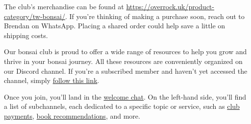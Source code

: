 \label{2025-04-news}


	
	

{}
\noindent
The club's merchandise can be found at \url{https://overrock.uk/product-category/tw-bonsai/}.
If you're thinking of making a purchase soon, reach out to Brendan on WhatsApp.
Placing a shared order could help save a little on shipping costs.

\medskip
{}
\noindent  
Our bonsai club is proud to offer a wide range of resources to help you grow and thrive in your bonsai journey.
All these resources are conveniently organized on our Discord channel.
If you're a subscribed member and haven’t yet accessed the channel, simply \href{https://discord.gg/N6yka6XJ}{follow this link}.

Once you join, you'll land in the \href{https://discord.com/channels/873817545013071872/1118677826208550923}{welcome chat}.
On the left\--hand side, you'll find a list of subchannels, each dedicated to a specific topic or service, such as \href{https://discord.com/channels/873817545013071872/1039691122148130876}{club payments}, \href{https://discord.com/channels/873817545013071872/1001189937409949698}{book recommendations}, and more.

